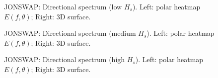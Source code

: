 \documentclass[11pt,letterpaper]{article}
\begin{document}
    \begin{figure}[H]\centering
    \begin{minipage}{0.49\textwidth}
        \resizebox{\linewidth}{!}{}
    \end{minipage}\hfill
    \begin{minipage}{0.49\textwidth}
        \resizebox{\linewidth}{!}{}
    \end{minipage}
    \caption{JONSWAP: Directional spectrum (low $H_s$). Left: polar heatmap $E(f,\theta)$; Right: 3D surface.}
    \label{fig:jonswap_spec_low}
    \end{figure}

    \begin{figure}[H]\centering
    \begin{minipage}{0.49\textwidth}
        \resizebox{\linewidth}{!}{}
    \end{minipage}\hfill
    \begin{minipage}{0.49\textwidth}
        \resizebox{\linewidth}{!}{}
    \end{minipage}
    \caption{JONSWAP: Directional spectrum (medium $H_s$). Left: polar heatmap $E(f,\theta)$; Right: 3D surface.}
    \label{fig:jonswap_spec_medium}
    \end{figure}

    \begin{figure}[H]\centering
    \begin{minipage}{0.49\textwidth}
        \resizebox{\linewidth}{!}{}
    \end{minipage}\hfill
    \begin{minipage}{0.49\textwidth}
        \resizebox{\linewidth}{!}{}
    \end{minipage}
    \caption{JONSWAP: Directional spectrum (high $H_s$). Left: polar heatmap $E(f,\theta)$; Right: 3D surface.}
    \label{fig:jonswap_spec_high}
    \end{figure}
\end{document}
